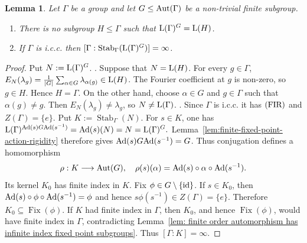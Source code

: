 \documentclass[12pt]{amsart} %
\theoremstyle{plain}
\newtheorem{lemma}[theorem]{Lemma}
\theoremstyle{definition}
\newcommand{\id}{{\rm id}}
\newcommand{\LL}{{\rm L}}
\newcommand{\Aut}{{\rm Aut}}
\newcommand{\Ad}{{\rm Ad}}
\begin{document}
\begin{lemma}\label{lem:finite-fixed-point-algebra}
Let $\Gamma$ be a group and let
$G\leq\Aut(\Gamma)$ be a non-trivial finite subgroup.
\begin{enumerate}
\item There is no subgroup $H\leq\Gamma$ such that $\LL(\Gamma)^G=\LL(H)$.
\item If $\Gamma$ is i.c.c. then $[\Gamma:\operatorname{Stab}_\Gamma(\LL(\Gamma)^G)]=\infty$.
\end{enumerate}
\end{lemma}
\begin{proof}
Put $N:=\LL(\Gamma)^G$.
\medskip
{}. Suppose that $N=\LL(H)$. For every $g\in\Gamma$, $E_N(\lambda_g)=\frac1{|G|}\sum_{\alpha\in G}\lambda_{\alpha(g)}\in\LL(H)$. The Fourier coefficient at $g$ is non-zero, so $g\in H$. Hence $H=\Gamma$.
On the other hand, choose $\alpha\in G$ and $g\in\Gamma$ such that
$\alpha(g)\neq g$. Then $E_N(\lambda_g)\neq\lambda_g$, so
$N\neq\LL(\Gamma)$.
\medskip
{}. Since $\Gamma$ is i.c.c. it has ${\rm(FIR)}$ and
$Z(\Gamma)=\{e\}$. Put $K:=\operatorname{Stab}_\Gamma(N)$. For $s\in K$, one has $\LL(\Gamma)^{\Ad(s)G\Ad(s^{-1})}
=\Ad(s)(N)
=N
=\LL(\Gamma)^G.$ Lemma~\ref{lem:finite-fixed-point-action-rigidity} therefore gives $\Ad(s)G\Ad(s^{-1})=G$. Thus conjugation defines a homomorphism
$$
\rho:K\longrightarrow\operatorname{Aut}(G),
\quad
\rho(s)(\alpha)
=\Ad(s)\circ\alpha\circ\Ad(s^{-1}).
$$
Its kernel $K_0$ has finite index in $K$. Fix
$\phi\in G\setminus\{\id\}$. If $s\in K_0$, then
$\Ad(s)\circ\phi\circ\Ad(s^{-1})=\phi$ and hence $s\phi(s^{-1})\in Z(\Gamma)=\{e\}$. Therefore $K_0\subseteq\operatorname{Fix}(\phi)$. If $K$ had finite index
in $\Gamma$, then $K_0$, and hence $\operatorname{Fix}(\phi)$, would have
finite index in $\Gamma$, contradicting
Lemma~\ref{lem: finite order automorphism has infinite index fixed point subgroups}.
Thus $[\Gamma:K]=\infty$.\end{proof}
\end{document}
